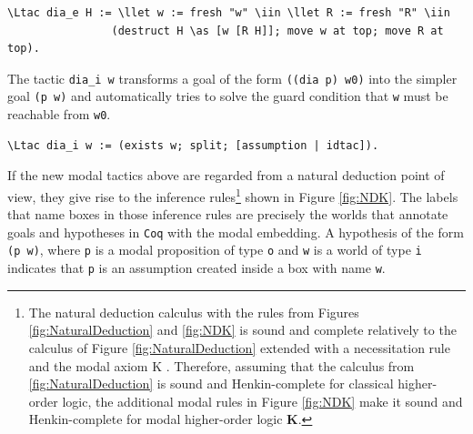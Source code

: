 \documentclass{llncs}
\newcommand{\red}[1]{\textcolor[rgb]{1,0,0}{#1}}
\newcommand{\blue}[1]{\textcolor[rgb]{0,0,1}{#1}}
\newcommand{\Ltac}{\red{Ltac}}
\newcommand{\llet}{\blue{let}}
\newcommand{\iin}{\blue{in}}
\newcommand{\as}{\blue{as}}
\newcommand{\Coq}{\texttt{Coq}\xspace}
\begin{document}
\begin{Verbatim}[commandchars=\\\{\},fontsize=\verbsize]
\Ltac dia_e H := \llet w := fresh "w" \iin \llet R := fresh "R" \iin 
                (destruct H \as [w [R H]]; move w at top; move R at top).
\end{Verbatim}

\noindent
The tactic \texttt{dia\_i w} transforms a goal of the form 
\texttt{((dia p) w0)} into the simpler goal \texttt{(p w)} 
and automatically tries to solve the guard condition that 
\texttt{w} must be reachable from \texttt{w0}.

\begin{Verbatim}[commandchars=\\\{\},fontsize=\verbsize]
\Ltac dia_i w := (exists w; split; [assumption | idtac]).
\end{Verbatim}

\noindent If the new modal tactics above are regarded from a natural
deduction point of view, they give rise to the inference
rules\footnote{The natural deduction calculus with the rules from
Figures \ref{fig:NaturalDeduction} and \ref{fig:NDK} is sound and
complete relatively to the calculus of Figure
\ref{fig:NaturalDeduction} extended with a necessitation rule and the
modal axiom K \cite{ToDo:UnpublishedPaperInGithub}. Therefore,
assuming that the calculus from \ref{fig:NaturalDeduction} is sound
and Henkin-complete for classical higher-order logic, the additional
modal rules in Figure \ref{fig:NDK} make it sound and Henkin-complete
for modal higher-order logic \textbf{K}.} shown in Figure
\ref{fig:NDK}. The labels that name boxes in those inference rules are
precisely the worlds that annotate goals and hypotheses in \Coq with
the modal embedding. A hypothesis of the form \texttt{(p w)}, where
\texttt{p} is a modal proposition of type \texttt{o} and \texttt{w} is
a world of type \texttt{i} indicates that \texttt{p} is an assumption
created inside a box with name \texttt{w}.
\end{document}

